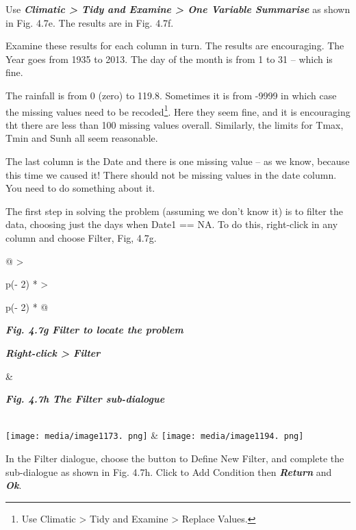 \documentclass[
  letterpaper,
  DIV=11,
  numbers=noendperiod]{scrreprt}
\begin{document}
Use \textbf{\emph{Climatic \textgreater{} Tidy and Examine
\textgreater{} One Variable Summarise}} as shown in Fig. 4.7e. The
results are in Fig. 4.7f.

Examine these results for each column in turn. The results are
encouraging. The Year goes from 1935 to 2013. The day of the month is
from 1 to 31 -- which is fine.

The rainfall is from 0 (zero) to 119.8. Sometimes it is from -9999 in
which case the missing values need to be recoded\footnote{Use Climatic
  \textgreater{} Tidy and Examine \textgreater{} Replace Values.}. Here
they seem fine, and it is encouraging tht there are less than 100
missing values overall. Similarly, the limits for Tmax, Tmin and Sunh
all seem reasonable.

The last column is the Date and there is one missing value -- as we
know, because this time we caused it! There should not be missing values
in the date column. You need to do something about it.

The first step in solving the problem (assuming we don't know it) is to
filter the data, choosing just the days when Date1 == NA. To do this,
right-click in any column and choose Filter, Fig, 4.7g.

\begin{longtable}[]{@{}
  >{\raggedright\arraybackslash}p{(\columnwidth - 2\tabcolsep) * }
  >{\raggedright\arraybackslash}p{(\columnwidth - 2\tabcolsep) * }@{}}
\toprule\noalign{}
\begin{minipage}[b]{\linewidth}\raggedright
\textbf{\emph{Fig. 4.7g Filter to locate the problem}}

\textbf{\emph{Right-click \textgreater{} Filter}}
\end{minipage} & \begin{minipage}[b]{\linewidth}\raggedright
\textbf{\emph{Fig. 4.7h The Filter sub-dialogue}}
\end{minipage} \\
\midrule\noalign{}
\endhead
\bottomrule\noalign{}
\endlastfoot
\texttt{[image: media/image1173. png]}
&
\texttt{[image: media/image1194. png]} \\
\end{longtable}

In the Filter dialogue, choose the button to Define New Filter, and
complete the sub-dialogue as shown in Fig. 4.7h. Click to Add Condition
then \textbf{\emph{Return}} and \textbf{\emph{Ok}}.
\end{document}
